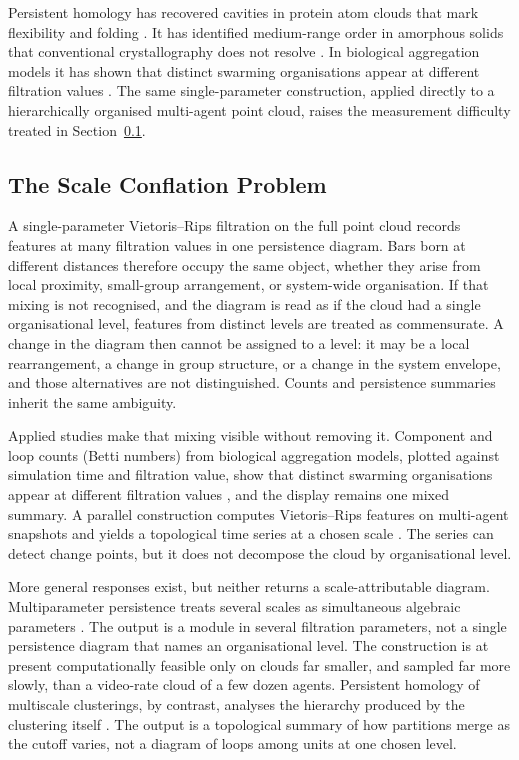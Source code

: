 Persistent homology has recovered cavities in protein atom clouds that
mark flexibility and folding \citep{xia2014}. It has identified
medium-range order in amorphous solids that conventional crystallography
does not resolve \citep{hiraoka2016}. In biological aggregation models
it has shown that distinct swarming organisations appear at different
filtration values \citep{topaz2015}. The same single-parameter
construction, applied directly to a hierarchically organised multi-agent
point cloud, raises the measurement difficulty treated in
Section~\ref{sec:scaleconflation}.

\subsection{The Scale Conflation Problem}
\label{sec:scaleconflation}

A single-parameter Vietoris--Rips filtration on the full point cloud
records features at many filtration values in one persistence diagram.
Bars born at different distances therefore occupy the same object,
whether they arise from local proximity, small-group arrangement, or
system-wide organisation. If that mixing is not recognised, and the
diagram is read as if the cloud had a single organisational level,
features from distinct levels are treated as commensurate. A change in
the diagram then cannot be assigned to a level: it may be a local
rearrangement, a change in group structure, or a change in the system
envelope, and those alternatives are not distinguished. Counts and
persistence summaries inherit the same ambiguity.

Applied studies make that mixing visible without removing it.
Component and loop counts (Betti numbers) from biological aggregation
models, plotted against simulation time and filtration value, show
that distinct swarming organisations appear at different filtration
values \citep{topaz2015}, and the display remains one mixed summary. A parallel construction computes
Vietoris--Rips features on multi-agent snapshots and yields a
topological time series at a chosen scale \citep{gu2022}. The series
can detect change points, but it does not decompose the cloud by
organisational level.

More general responses exist, but neither returns a
scale-attributable diagram. Multiparameter persistence treats several
scales as simultaneous algebraic parameters \citep{botnan2022}. The
output is a module in several filtration parameters, not a single
persistence diagram that names an organisational level. The
construction is at present computationally feasible only on clouds far
smaller, and sampled far more slowly, than a video-rate cloud of a few
dozen agents. Persistent homology of multiscale clusterings, by
contrast, analyses the hierarchy produced by the clustering itself
\citep{schindler2023}. The output is a topological summary of how
partitions merge as the cutoff varies, not a diagram of loops among
units at one chosen level.

